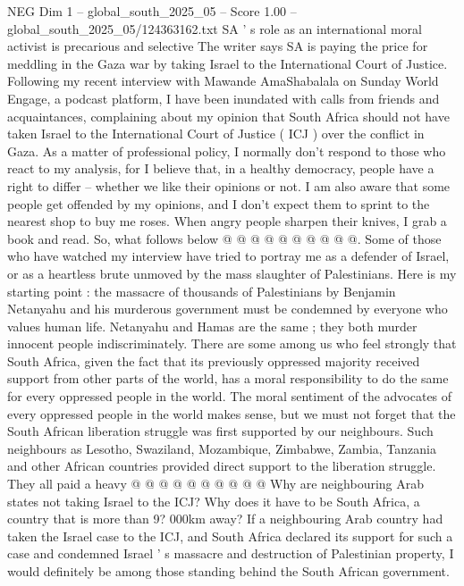 \begin{textsample}{NEG Dim 1 – global\_south\_2025\_05 – Score 1.00 – global\_south\_2025\_05/124363162.txt}  \label{ex:f1_neg_169}
SA ' s role as an international moral activist is precarious and selective The writer says SA is paying the price for meddling in the Gaza war by taking Israel to the International Court of Justice.
Following my recent interview with Mawande AmaShabalala on Sunday World Engage, a podcast platform, I have been inundated with calls from friends and acquaintances, complaining about my opinion that South Africa should not have taken Israel to the International Court of Justice ( ICJ ) over the conflict in Gaza.
As a matter of professional policy, I normally don't respond to those who react to my analysis, for I believe that, in a healthy democracy, people have a right to differ -- whether we like their opinions or not.
I am also aware that some people get offended by my opinions, and I don't expect them to sprint to the nearest shop to buy me roses.
When angry people sharpen their knives, I grab a book and read.
So, what follows below @ @ @ @ @ @ @ @ @ @.
Some of those who have watched my interview have tried to portray me as a defender of Israel, or as a heartless brute unmoved by the mass slaughter of Palestinians.
Here is my starting point : the massacre of thousands of Palestinians by Benjamin Netanyahu and his murderous government must be condemned by everyone who values human life.
Netanyahu and Hamas are the same ; they both murder innocent people indiscriminately.
There are some among us who feel strongly that South Africa, given the fact that its previously oppressed majority received support from other parts of the world, has a moral responsibility to do the same for every oppressed people in the world.
The moral sentiment of the advocates of every oppressed people in the world makes sense, but we must not forget that the South African liberation struggle was first supported by our neighbours.
Such neighbours as Lesotho, Swaziland, Mozambique, Zimbabwe, Zambia, Tanzania and other African countries provided direct support to the liberation struggle.
They all paid a heavy @ @ @ @ @ @ @ @ @ @ Why are neighbouring Arab states not taking Israel to the ICJ?
Why does it have to be South Africa, a country that is more than 9? 000km away?
If a neighbouring Arab country had taken the Israel case to the ICJ, and South Africa declared its support for such a case and condemned Israel ' s massacre and destruction of Palestinian property, I would definitely be among those standing behind the South African government.

\end{textsample}
